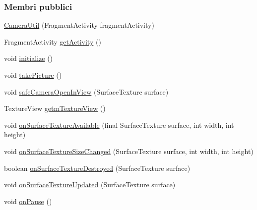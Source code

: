 \subsubsection*{Membri pubblici}
\begin{DoxyCompactItemize}
\item 
\hyperlink{classit_1_1unibo_1_1torsello_1_1bluetoothpositioning_1_1util_1_1CameraUtil_a0d016ada31702f7069b01740ae3bf22f_a0d016ada31702f7069b01740ae3bf22f}{Camera\+Util} (Fragment\+Activity fragment\+Activity)
\item 
Fragment\+Activity \hyperlink{classit_1_1unibo_1_1torsello_1_1bluetoothpositioning_1_1util_1_1CameraUtil_ad49c34169e8267bb8f841d27f0d5804b_ad49c34169e8267bb8f841d27f0d5804b}{get\+Activity} ()
\item 
void \hyperlink{classit_1_1unibo_1_1torsello_1_1bluetoothpositioning_1_1util_1_1CameraUtil_ae88de176ab49ea6eafa5864701ecc748_ae88de176ab49ea6eafa5864701ecc748}{initialize} ()
\item 
void \hyperlink{classit_1_1unibo_1_1torsello_1_1bluetoothpositioning_1_1util_1_1CameraUtil_a4223fa54dcdd332f394f9d4b6395ec79_a4223fa54dcdd332f394f9d4b6395ec79}{take\+Picture} ()
\item 
void \hyperlink{classit_1_1unibo_1_1torsello_1_1bluetoothpositioning_1_1util_1_1CameraUtil_af983e424981a3991fd9d241217328bc8_af983e424981a3991fd9d241217328bc8}{safe\+Camera\+Open\+In\+View} (Surface\+Texture surface)
\item 
Texture\+View \hyperlink{classit_1_1unibo_1_1torsello_1_1bluetoothpositioning_1_1util_1_1CameraUtil_a5465cd771c9607dce53409cba1e4e1d9_a5465cd771c9607dce53409cba1e4e1d9}{getm\+Texture\+View} ()
\item 
void \hyperlink{classit_1_1unibo_1_1torsello_1_1bluetoothpositioning_1_1util_1_1CameraUtil_ae57c993ba40e5d0a601e246abc67b919_ae57c993ba40e5d0a601e246abc67b919}{on\+Surface\+Texture\+Available} (final Surface\+Texture surface, int width, int height)
\item 
void \hyperlink{classit_1_1unibo_1_1torsello_1_1bluetoothpositioning_1_1util_1_1CameraUtil_ae1a6cb9d0f4b5ea28321088152126b79_ae1a6cb9d0f4b5ea28321088152126b79}{on\+Surface\+Texture\+Size\+Changed} (Surface\+Texture surface, int width, int height)
\item 
boolean \hyperlink{classit_1_1unibo_1_1torsello_1_1bluetoothpositioning_1_1util_1_1CameraUtil_a0189f59aac3827e05165a29cc8658d95_a0189f59aac3827e05165a29cc8658d95}{on\+Surface\+Texture\+Destroyed} (Surface\+Texture surface)
\item 
void \hyperlink{classit_1_1unibo_1_1torsello_1_1bluetoothpositioning_1_1util_1_1CameraUtil_aede93d13d58ef68302980917ac06612a_aede93d13d58ef68302980917ac06612a}{on\+Surface\+Texture\+Updated} (Surface\+Texture surface)
\item 
void \hyperlink{classit_1_1unibo_1_1torsello_1_1bluetoothpositioning_1_1util_1_1CameraUtil_a1ebe095e57994dfb73a9ead49d72017e_a1ebe095e57994dfb73a9ead49d72017e}{on\+Pause} ()
\end{DoxyCompactItemize}
